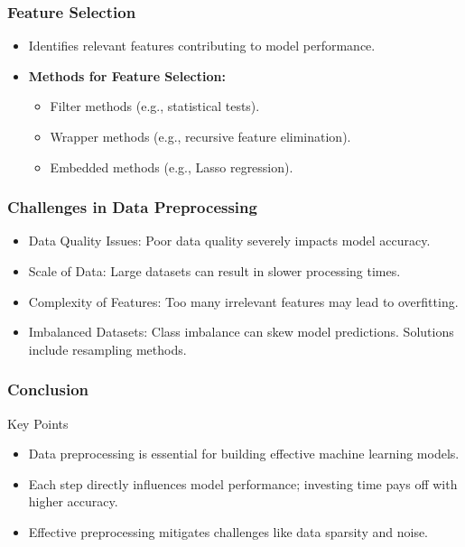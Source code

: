 \documentclass[aspectratio=169]{beamer}
\begin{document}
\begin{frame}
    \frametitle{Feature Selection}
    \begin{itemize}
        \item Identifies relevant features contributing to model performance.
        \item \textbf{Methods for Feature Selection:}
        \begin{itemize}
            \item Filter methods (e.g., statistical tests).
            \item Wrapper methods (e.g., recursive feature elimination).
            \item Embedded methods (e.g., Lasso regression).
        \end{itemize}
    \end{itemize}
\end{frame}

\begin{frame}
    \frametitle{Challenges in Data Preprocessing}
    \begin{itemize}
        \item Data Quality Issues: Poor data quality severely impacts model accuracy.
        \item Scale of Data: Large datasets can result in slower processing times.
        \item Complexity of Features: Too many irrelevant features may lead to overfitting.
        \item Imbalanced Datasets: Class imbalance can skew model predictions. Solutions include resampling methods.
    \end{itemize}
\end{frame}

\begin{frame}
    \frametitle{Conclusion}
    \begin{block}{Key Points}
        \begin{itemize}
            \item Data preprocessing is essential for building effective machine learning models.
            \item Each step directly influences model performance; investing time pays off with higher accuracy.
            \item Effective preprocessing mitigates challenges like data sparsity and noise.
        \end{itemize}
    \end{block}
\end{frame}
\end{document}
